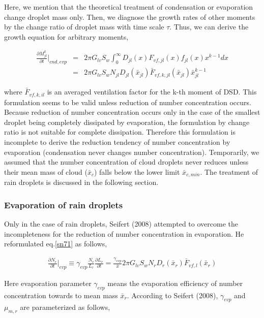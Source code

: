 Here, we mention that the theoretical treatment of condensation or evaporation change droplet mass only. Then, we diagnose the growth rates of other moments by the change ratio of droplet mass with time scale $\tau$. Thus, we can derive the growth equation for arbitrary moments,

\begin{eqnarray}
\frac{\partial M_{jl}^{k}}{\partial t}\Bigr|_{cnd,evp}&=&2\pi G_{lv}S_{w}\int_{0}^{\infty}D_{jl}(x)F_{vf,jl}(x)f_{jl}(x)x^{k-1}dx\nonumber\\
&=&2\pi G_{lv}S_{w}N_{jl}D_{jl}(\bar{x}_{jl})\bar{F}_{vf,k,jl}(\bar{x}_{jl})\bar{x}_{jl}^{k-1}\label{sn71}
\end{eqnarray}

where $\bar{F}_{vf,k,il}$ is an averaged ventilation factor for the k-th moment of DSD. This formulation seems to be valid unless reduction of number concentration occurs. Because reduction of number concentration occurs only in the case of the smallest droplet being completely dissipated by evaporation, the formulation by change ratio is not suitable for complete dissipation. Therefore this formulation is incomplete to derive the reduction tendency of number concentration by evaporation (condensation never changes number concentration). Temporarily, we assumed that the number concentration of cloud droplets never reduces unless their mean mass of cloud ($\bar{x}_{c}$) falls below the lower limit $\bar{x}_{c,min}$. The treatment of rain droplets is discussed in the following section.


\subsubsection{Evaporation of rain droplets}
Only in the case of rain droplets, Seifert (2008) attempted to overcome the incompleteness for the reduction of number concentration in evaporation. He reformulated eq.\ref{sn71} as follows,

\begin{eqnarray}
\frac{\partial N_{r}}{\partial t}\Bigr|_{evp}\equiv \gamma_{evp}\frac{N_{r}}{L_{r}}\frac{\partial L_{r}}{\partial t}=\frac{\gamma_{evp}}{\bar{x}}2\pi G_{lv}S_{w}N_{r}D_{r}(\bar{x}_{r})\bar{F}_{vf,l}(\bar{x}_{r})\label{sn72}
\end{eqnarray}

Here evaporation parameter $\gamma_{evp}$ means the evaporation efficiency of number concentration towards to mean mass $\bar{x}_{r}$. According to Seifert (2008), $\gamma_{evp}$ and $\mu_{m,r}$ are parameterized as follows,

